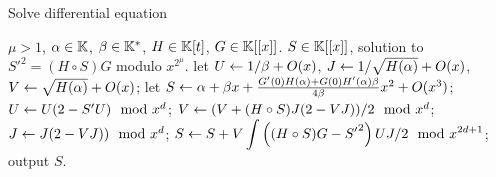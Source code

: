\begin{algorithm}
  \caption{\label{alg:le-si-diff} Solve differential equation}
  \begin{algorithmic}[1]
    \REQUIRE $\mu>1$, $\alpha\in\mathbb{K}$, $\beta\in\mathbb{K}^\ast$, $H\in\mathbb{K}[t]$, $G\in\mathbb{K}[[x]]$.
    \ENSURE $S\in\mathbb{K}[[x]]$, solution to ${S'}^2=(H\circ S)G$ modulo $x^{2^\mu}$.
    \STATE let $U \leftarrow 1/\beta +O(x)$, $J \leftarrow 1/\sqrt{H(\alpha)} + O(x)$, $V \leftarrow \sqrt{H(\alpha)} + O(x)$;
    \STATE let $S \leftarrow \alpha + \beta x +  \frac{G'(0)H(\alpha) + G(0)H'(\alpha)\beta}{4\beta}x^2+O(x^3)$;
    \STATE $U \leftarrow U(2 - S' U) \mod x^d$;
    \STATE $V \leftarrow (V +  (H\circ S) J (2 - VJ))/2 \mod x^d$;
    \STATE $J \leftarrow J(2-VJ)) \mod x^d$;
    \STATE \label{alg:le-si-diff:int}$S \leftarrow S + V\displaystyle\int\left((H\circ S)G - {S'}^2\right)UJ/2 \mod x^{2d+1}$;
    \ENDFOR
    \STATE output $S$.
  \end{algorithmic}
\end{algorithm}

